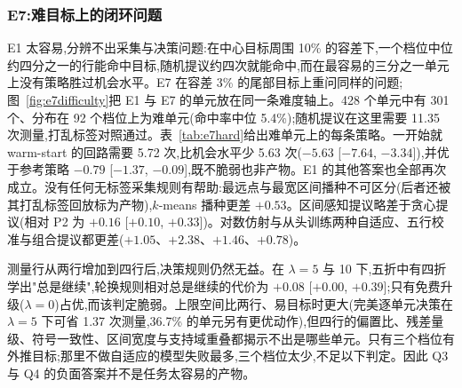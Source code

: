 \documentclass[11pt,a4paper]{ctexart}
\begin{document}
\subsubsection{E7:难目标上的闭环问题}
\label{sec:e7}
E1 太容易,分辨不出采集与决策问题:在中心目标周围 10\% 的容差下,一个档位中位约四分之一的行能命中目标,随机提议约四次就能命中,而在最容易的三分之一单元上没有策略胜过机会水平。E7 在容差 3\% 的尾部目标上重问同样的问题;图~\ref{fig:e7difficulty}把 E1 与 E7 的单元放在同一条难度轴上。428 个单元中有 301 个、分布在 92 个档位上为难单元(命中率中位 5.4\%);随机提议在这里需要 11.35 次测量,打乱标签对照通过。表~\ref{tab:e7hard}给出难单元上的每条策略。一开始就 warm-start 的回路需要 5.72 次,比机会水平少 5.63 次($-5.63$ [$-7.64$, $-3.34$]),并优于参考策略 $-0.79$ [$-1.37$, $-0.09$],既不脆弱也非产物。E1 的其他答案也全部再次成立。没有任何无标签采集规则有帮助:最远点与最宽区间播种不可区分(后者还被其打乱标签回放标为产物),$k$-means 播种更差 $+0.53$。区间感知提议略差于贪心提议(相对 P2 为 $+0.16$ [$+0.10$, $+0.33$])。对数仿射与从头训练两种自适应、五行校准与组合提议都更差($+1.05$、$+2.38$、$+1.46$、$+0.78$)。

测量行从两行增加到四行后,决策规则仍然无益。在 $\lambda = 5$ 与 10 下,五折中有四折学出"总是继续",轮换规则相对总是继续的代价为 $+0.08$ [$+0.00$, $+0.39$];只有免费升级($\lambda = 0$)占优,而该判定脆弱。上限空间比两行、易目标时更大(完美逐单元决策在 $\lambda = 5$ 下可省 1.37 次测量,36.7\% 的单元另有更优动作),但四行的偏置比、残差量级、符号一致性、区间宽度与支持域重叠都揭示不出是哪些单元。只有三个档位有外推目标;那里不做自适应的模型失败最多,三个档位太少,不足以下判定。因此 Q3 与 Q4 的负面答案并不是任务太容易的产物。
\end{document}
